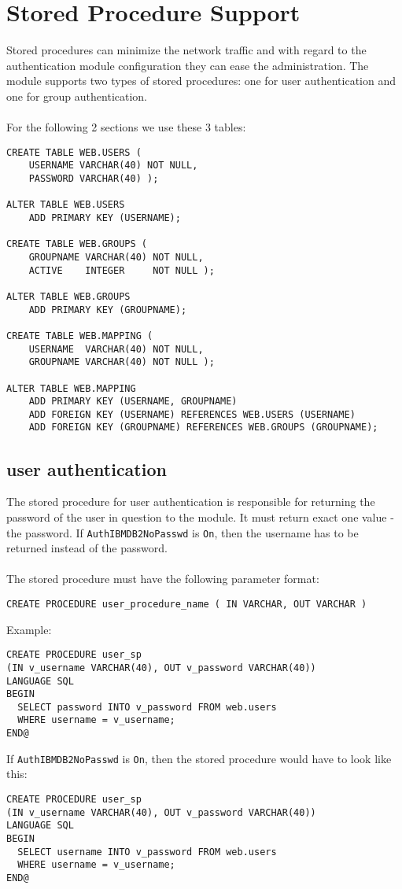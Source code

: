 \documentclass[11pt,letterpaper]{article}
\begin{document}
\begin{appendix}
\hypertarget{hsps}{}
\section{Stored Procedure Support} \label{sp}
Stored procedures can minimize the network traffic and with regard to the authentication module configuration they can ease the administration. The module supports two types of stored procedures: one for user authentication and one for group authentication.\\
\\
For the following 2 sections we use these 3 tables:
\\
\begin{verbatim}
CREATE TABLE WEB.USERS (
    USERNAME VARCHAR(40) NOT NULL,
    PASSWORD VARCHAR(40) );

ALTER TABLE WEB.USERS
    ADD PRIMARY KEY (USERNAME);

CREATE TABLE WEB.GROUPS (
    GROUPNAME VARCHAR(40) NOT NULL,
    ACTIVE    INTEGER     NOT NULL );

ALTER TABLE WEB.GROUPS
    ADD PRIMARY KEY (GROUPNAME);

CREATE TABLE WEB.MAPPING (
    USERNAME  VARCHAR(40) NOT NULL,
    GROUPNAME VARCHAR(40) NOT NULL );

ALTER TABLE WEB.MAPPING
    ADD PRIMARY KEY (USERNAME, GROUPNAME)
    ADD FOREIGN KEY (USERNAME) REFERENCES WEB.USERS (USERNAME)
    ADD FOREIGN KEY (GROUPNAME) REFERENCES WEB.GROUPS (GROUPNAME);
\end{verbatim}
\newpage
\hypertarget{husersp}{}
\subsection{user authentication} \label{usersp}
The stored procedure for user authentication is responsible for returning the password of the user in question to the module. It must return exact one value - the password. If {\tt AuthIBMDB2NoPasswd} is {\tt On}, then the username has to be returned instead of the password.\\
\\
The stored procedure must have the following parameter format:
\begin{verbatim}
CREATE PROCEDURE user_procedure_name ( IN VARCHAR, OUT VARCHAR )
\end{verbatim}
Example:
\begin{verbatim}
CREATE PROCEDURE user_sp
(IN v_username VARCHAR(40), OUT v_password VARCHAR(40))
LANGUAGE SQL
BEGIN
  SELECT password INTO v_password FROM web.users 
  WHERE username = v_username;
END@
\end{verbatim}
If {\tt AuthIBMDB2NoPasswd} is {\tt On}, then the stored procedure would have to look like this:
\begin{verbatim}
CREATE PROCEDURE user_sp
(IN v_username VARCHAR(40), OUT v_password VARCHAR(40))
LANGUAGE SQL
BEGIN
  SELECT username INTO v_password FROM web.users 
  WHERE username = v_username;
END@
\end{verbatim}
\newpage
\hypertarget{hgroupsp}{}

\end{appendix}
\end{document}
